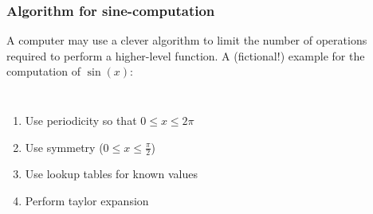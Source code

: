 \begin{frame}
  \frametitle{Algorithm for sine-computation}
  A computer may use a clever algorithm to limit the number of operations required to perform a higher-level function. A (fictional!) example for the computation of $\sin(x)$:\\
  \begin{columns}
    \begin{enumerate}[<+->]
      \item<2-> Use periodicity so that $0 \leq x \leq 2\pi$
      \item<3-> Use symmetry ($0\leq x \leq \frac{\pi}{2}$)
      \item<4-> Use lookup tables for known values
      \item<5-> Perform taylor expansion
    \end{enumerate}


\end{columns}
\end{frame}

